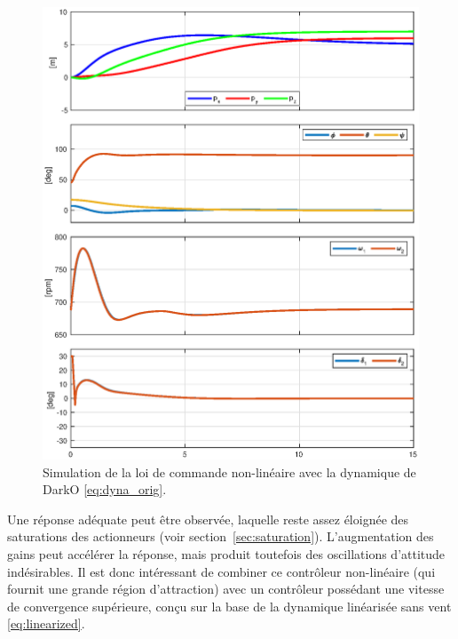 \begin{figure}[ht!]
  \centering
  \includegraphics[trim=0cm 0.6cm 0cm 0.6cm,clip,width=0.8\columnwidth]{figures/global2.eps}
  \caption{Simulation de la loi de commande non-linéaire avec la dynamique de DarkO \eqref{eq:dyna_orig}.}
  \label{fig_global_contol}
\end{figure}
Une réponse adéquate peut être observée, laquelle reste assez éloignée des saturations des actionneurs (voir section~\ref{sec:saturation}). L'augmentation des gains peut accélérer la réponse, mais produit toutefois des oscillations d'attitude indésirables. Il est donc intéressant de combiner ce contrôleur non-linéaire (qui fournit une grande région d'attraction) avec un contrôleur possédant une vitesse de convergence supérieure, conçu sur la base de la dynamique linéarisée sans vent \eqref{eq:linearized}.



